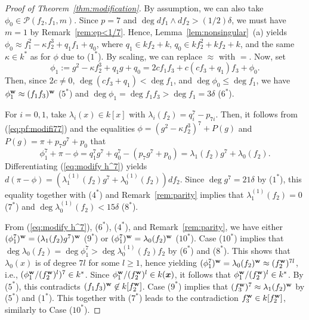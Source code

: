 \documentclass{amsart}
\theoremstyle{plain}
\theoremstyle{definition}
\newcommand{\x}{{\boldsymbol x}}
\newcommand{\w}{{\bf w}}
\newcommand{\kxr}{k(\x)}
\begin{document}
\begin{proof}[Proof of Theorem~{\rm \ref{thm:modification}}]
By assumption, 
we can 
also 
take $\phi _0\in \mathcal{P}(f_2,f_1,m)$. 
Since $p=7$ and 
$\deg df_1\wedge df_2>(1/2)\delta $, 
we must have 
$m=1$ by Remark~\ref{rem:ep<1/7}. 
Hence, 
Lemma~\ref{lem:nonsingular}~(a) yields 
$\phi _0\approx f_1^2-\kappa f_2^3+q_1f_1+q_0$, 
where $q_1\in kf_2+k$, $q_0\in kf_2^2+kf_2+k$, 
and the same $\kappa \in k^*$ as for $\phi $ due to ($1^*$). 
By scaling, we can replace $\approx $ with $=$. 
Now, set 
\begin{equation}\label{eq:pf:modifi77}
\phi  _1:=g^2-\kappa f_2^3+q_1g+q_0
=2cf_1f_3+c(cf_3+q_1)f_3+\phi _0. 
\end{equation}
Then, 
since 
$2c\ne 0$, 
$\deg (cf_3+q_1)<\deg f_1$, 
and $\deg \phi _0\le \deg f_1$, 
we have 
$\phi _1^{\w }\approx (f_1f_3)^{\w }$ ($5^*$) 
and 
$\deg \phi  _1=\deg f_1f_3>\deg f_1=3\delta $ ($6^*$). 



For $i=0,1$, 
take $\lambda _{i}(x)\in k[x]$ with 
$\lambda _{i}(f_2)=q_i^7-p_{7i}$. 
Then, it follows 
from (\ref{eq:pf:modifi77}) and the equalities 
$\phi =(g^2-\kappa f_2^3)^7+P(g)$ and $P(g)=\pi +p_7g^7+p_0$ 
that 
\begin{equation}\label{eq:modify h^7}
\phi  _1^7+\pi -\phi =q_1^7g^7+q_0^7-(p_7g^7+p_0)
=\lambda _1(f_2)g^7+\lambda _0(f_2). 
\end{equation}
Differentiating (\ref{eq:modify h^7}) yields 
$d(\pi -\phi )
=(\lambda _1^{(1)}(f_2)g^7+\lambda _0^{(1)}(f_2))df_2$. 
Since 
$\deg g^7=21\delta $ by ($1^*$), 
this equality 
together with ($4^*$) and Remark~\ref{rem:parity} 
implies that 
$\lambda _1^{(1)}(f_2)=0$ ($7^*$) 
and $\deg \lambda _0^{(1)}(f_2)<15\delta $ ($8^*$). 


From 
(\ref{eq:modify h^7}), ($6^*$), ($4^*$), 
and Remark~\ref{rem:parity}, 
we have 
either 
$(\phi  _1^7)^{\w }=(\lambda _1(f_2)g^7)^{\w }$ ($9^*$) or 
$(\phi  _1^7)^{\w }=\lambda _0(f_2)^{\w }$ ($10^*$). 
Case ($10^*$) implies that 
$\deg \lambda _0(f_2)=\deg \phi  _1^7>\deg \lambda _0^{(1)}(f_2)f_2$ 
by ($6^*$) and ($8^*$). 
This shows that $\lambda _0(x)$ is of degree $7l$ for some $l\ge 1$, 
hence 
yielding $(\phi  _1^7)^{\w }=\lambda _0(f_2)^{\w }\approx (f_2^{\w })^{7l}$, 
i.e., 
$(\phi _1^{\w }/(f_2^{\w })^{l})^7\in k^*$. 
Since $\phi _1^{\w }/(f_2^{\w })^{l}\in \kxr $, 
it follows that $\phi _1^{\w }/(f_2^{\w })^{l}\in k^*$. 
By ($5^*$), 
this contradicts $(f_1f_3)^{\w }\not\in k[f_2^{\w }]$. 
Case ($9^*$) implies that $(f_3^{\w })^7\approx \lambda _1(f_2)^{\w }$ 
by ($5^*$) and ($1^*$). 
This together with ($7^*$) leads to the contradiction 
$f_3^{\w }\in k[f_2^{\w }]$, 
similarly to Case ($10^*$). 
\end{proof}
\end{document}
